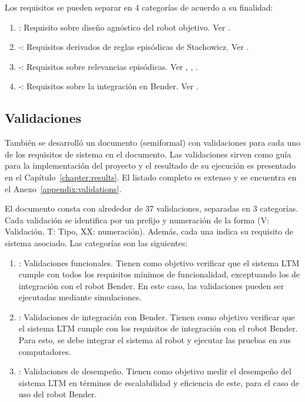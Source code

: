 Los requisitos se pueden separar en 4 categorías de acuerdo a su finalidad:
\begin{enumerate}
\item {}: Requisito sobre diseño agnóstico del robot objetivo. Ver .
\item {}-: Requisitos derivados de reglas episódicas de Stachowicz. Ver .
\item {}-: Requisitos sobre relevancias episódicas. Ver , , .
\item {}-: Requisitos sobre la integración en Bender. Ver .
\end{enumerate}

\subsection{Validaciones}

También se desarrolló un documento (semiformal) con validaciones para cada uno de los requisitos de sistema en el documento. Las validaciones sirven como guía para la implementación del proyecto y el resultado de su ejecución es presentado en el Capítulo~\ref{chapter:results}. El listado completo es extenso y se encuentra en el Anexo~\ref{appendix:validations}.

El documento consta con alrededor de 37 validaciones, separadas en 3 categorías. Cada validación se identifica por un prefijo y numeración de la forma  (V: Validación, T: Tipo, XX: numeración). Además, cada una indica su requisito de sistema asociado. Las categorías son las siguientes:
\begin{enumerate}
	\item {}: Validaciones funcionales. Tienen como objetivo verificar que el sistema LTM cumple con todos los requisitos mínimos de funcionalidad, exceptuando los de integración con el robot Bender. En este caso, las validaciones pueden ser ejecutadas mediante simulaciones.
	\item {}: Validaciones de integración con Bender. Tienen como objetivo verificar que el sistema LTM cumple con los requisitos de integración con el robot Bender. Para esto, se debe integrar el sistema al robot y ejecutar las pruebas en sus computadores.
	\item {}: Validaciones de desempeño. Tienen como objetivo medir el desempeño del sistema LTM en términos de escalabilidad y eficiencia de este, para el caso de uso del robot Bender.
\end{enumerate}

